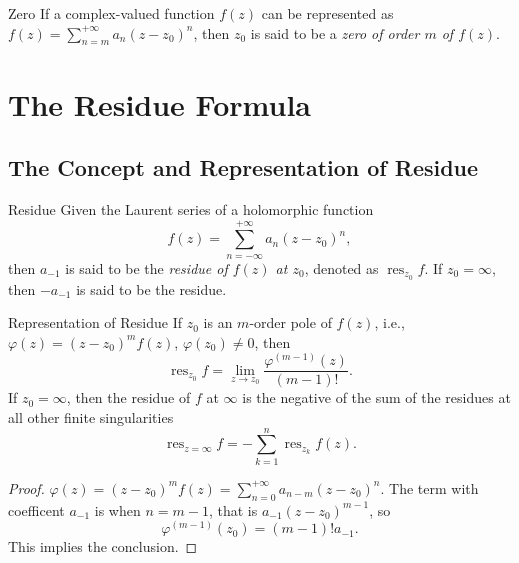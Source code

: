 \begin{definition}{Zero}{}
  If a complex-valued function $f(z)$ can be represented as $f(z) = \sum_{n = m}^{+\infty} a_n(z-z_0)^n$,
  then $z_0$ is said to be a \emph{zero of order $m$ of $f(z)$}.
\end{definition}

\section{The Residue Formula}

\subsection{The Concept and Representation of Residue}

\begin{definition}{Residue}{}
  Given the Laurent series of a holomorphic function
  \begin{equation}
    f(z) = \sum_{n = -\infty}^{+\infty}a_n(z-z_0)^n,
  \end{equation}
  then $a_{-1}$ is said to be the \emph{residue of $f(z)$ at $z_0$},
  denoted as $\operatorname{res}_{z_0} f$.
  If $z_0 = \infty$, then $- a_{-1}$ is said to be the residue.
\end{definition}

\begin{proposition}{Representation of Residue}{}
  If $z_0$ is an $m$-order pole of $f(z)$, i.e.,
  $\varphi(z) = (z-z_0)^mf(z) $, $\varphi(z_0) \neq 0$, then
  \begin{equation}
    \operatorname{res}_{z_0} f = \lim \limits _{z \rightarrow z_0}\frac{\varphi^{(m-1)}(z)}{(m-1)!}.
  \end{equation}
  If $z_0 = \infty$, then the residue of $f$ at $\infty$ is the negative of the sum of the residues at
  all other finite singularities
  \begin{equation}
    \operatorname{res}_{z = \infty} f = - \sum\limits_{k = 1}^n \operatorname{res}_{z_k} f(z).
  \end{equation}
\end{proposition}

\begin{proof}
  $\varphi(z) = (z-z_0)^m f(z) = \sum _{n = 0}^{+\infty} a_{n-m}(z - z_0)^n$.
  The term with coefficent $a_{-1}$ is when $n = m-1$, that is $a_{-1}(z - z_0)^{m-1}$, so
  \begin{equation}
    \varphi^{(m-1)}(z_0) = (m-1)! a_{-1}.
  \end{equation}
  This implies the conclusion.
\end{proof}

